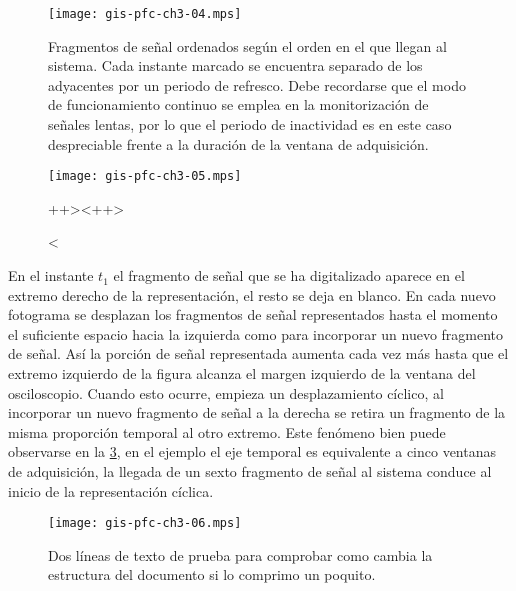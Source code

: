 \begin{figure}
	\begin{center}
		\texttt{[image: gis-pfc-ch3-04.mps]}
	\end{center}
	\caption[Fragmentos de señal ordenados según el orden en el que llegan al sistema]{Fragmentos de señal ordenados según el orden en el que llegan al sistema. Cada instante marcado se encuentra separado de los adyacentes por un periodo de refresco. Debe recordarse que el modo de funcionamiento continuo se emplea en la monitorización de señales lentas, por lo que el periodo de inactividad es en este caso despreciable frente a la duración de la ventana de adquisición.}
	\label{fig:freesignalcont}
\end{figure}

\begin{figure}
	\begin{center}
		\texttt{[image: gis-pfc-ch3-05.mps]}
	\end{center}
	\caption[Dos líneas de prueba]{Dos líneas de texto de prueba para comprobar como cambia la estructura del documento si lo comprimo un poquito.}
	\caption[<++>]<++>{}<++>
	\label{fig:modconti}
\end{figure}

En el instante $t_1$ el fragmento de señal que se ha digitalizado aparece en el extremo derecho de la representación, el resto se deja en blanco. En cada nuevo fotograma se desplazan los fragmentos de señal representados hasta el momento el suficiente espacio hacia la izquierda como para incorporar un nuevo fragmento de señal. Así la porción de señal representada aumenta cada vez más hasta que el extremo izquierdo de la figura alcanza el margen izquierdo de la ventana del osciloscopio. Cuando esto ocurre, empieza un desplazamiento cíclico, al incorporar un nuevo fragmento de señal a la derecha se retira un fragmento de la misma proporción temporal al otro extremo. Este fenómeno bien puede observarse en la \cref{fig:modcontii}, en el ejemplo el eje temporal es equivalente a cinco ventanas de adquisición, la llegada de un sexto fragmento de señal al sistema conduce al inicio de la representación cíclica.\par

\begin{figure}
	\begin{center}
		\texttt{[image: gis-pfc-ch3-06.mps]}
	\end{center}
	\caption[Dos líneas de prueba]{Dos líneas de texto de prueba para comprobar como cambia la estructura del documento si lo comprimo un poquito.}
	\label{fig:modcontii}
\end{figure}

